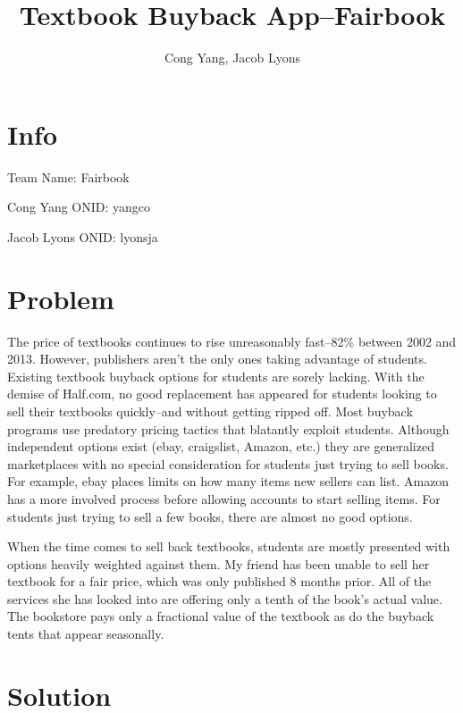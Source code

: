 \documentclass[12pt]{article}
\title{Textbook Buyback App--Fairbook}
\author{Cong Yang, Jacob Lyons}
\begin{document}
	\maketitle

	\tableofcontents
                \section{Info}
		Team Name: Fairbook \par
		Cong Yang ONID: yangco \par
		Jacob Lyons ONID: lyonsja \par


	\section{Problem}
	The price of textbooks continues to rise unreasonably fast--82\% between 2002 and 2013.
	\cite{cnbc} 
	However, publishers aren't the only ones taking advantage of students. 
	Existing textbook buyback options for students are sorely lacking. With the demise of Half.com, 
	no good replacement has appeared for students looking to sell their textbooks quickly--and without 
	getting ripped off.	
        Most buyback programs use predatory pricing tactics that blatantly exploit students. Although independent options 
	exist (ebay, craigslist, Amazon, etc.) they are
	generalized marketplaces with no special consideration for students just trying to sell books. For example,
	ebay places limits on how many items new sellers can list. 
	Amazon has a more involved process before allowing accounts to start selling items. For students just trying to sell a few books,
	there are almost no good options.\par
	
	When the time comes to sell back textbooks, students are mostly presented with options heavily weighted
	against them. My friend has been unable to sell her textbook for a fair price, which was only published 8 months prior.
	All of the services she has looked into are offering only a tenth of the book's actual value. The bookstore pays only
	a fractional value of the textbook as do the buyback tents that appear seasonally. \par
		

	\section{Solution}
\end{document}

